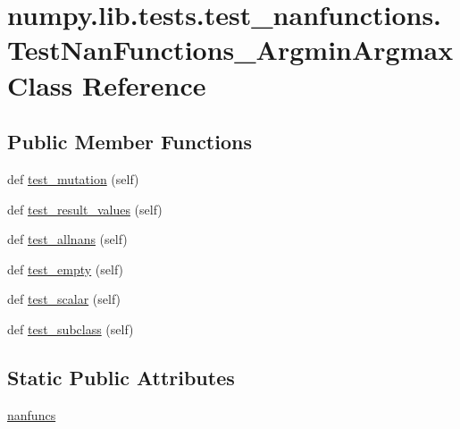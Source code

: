 \hypertarget{classnumpy_1_1lib_1_1tests_1_1test__nanfunctions_1_1TestNanFunctions__ArgminArgmax}{}\section{numpy.\+lib.\+tests.\+test\+\_\+nanfunctions.\+Test\+Nan\+Functions\+\_\+\+Argmin\+Argmax Class Reference}
\label{classnumpy_1_1lib_1_1tests_1_1test__nanfunctions_1_1TestNanFunctions__ArgminArgmax}
\subsection*{Public Member Functions}
\begin{DoxyCompactItemize}
\item 
def \hyperlink{classnumpy_1_1lib_1_1tests_1_1test__nanfunctions_1_1TestNanFunctions__ArgminArgmax_aa7633e6f9740240e2009f9198b0809ed}{test\+\_\+mutation} (self)
\item 
def \hyperlink{classnumpy_1_1lib_1_1tests_1_1test__nanfunctions_1_1TestNanFunctions__ArgminArgmax_afff68f83b06e080f87825e584573b0ee}{test\+\_\+result\+\_\+values} (self)
\item 
def \hyperlink{classnumpy_1_1lib_1_1tests_1_1test__nanfunctions_1_1TestNanFunctions__ArgminArgmax_a577742e7368bc3f7d141e1c5520093db}{test\+\_\+allnans} (self)
\item 
def \hyperlink{classnumpy_1_1lib_1_1tests_1_1test__nanfunctions_1_1TestNanFunctions__ArgminArgmax_a8706d090f1c32057b410a47b95d40544}{test\+\_\+empty} (self)
\item 
def \hyperlink{classnumpy_1_1lib_1_1tests_1_1test__nanfunctions_1_1TestNanFunctions__ArgminArgmax_a4f2064767fc866be92fac87be8f80f11}{test\+\_\+scalar} (self)
\item 
def \hyperlink{classnumpy_1_1lib_1_1tests_1_1test__nanfunctions_1_1TestNanFunctions__ArgminArgmax_af6da234ab45e9d8b09da7c8abc397636}{test\+\_\+subclass} (self)
\end{DoxyCompactItemize}
\subsection*{Static Public Attributes}
\begin{DoxyCompactItemize}
\item 
\hyperlink{classnumpy_1_1lib_1_1tests_1_1test__nanfunctions_1_1TestNanFunctions__ArgminArgmax_ab266362945b71dfeb923f6c39fee07a3}{nanfuncs}
\end{DoxyCompactItemize}


